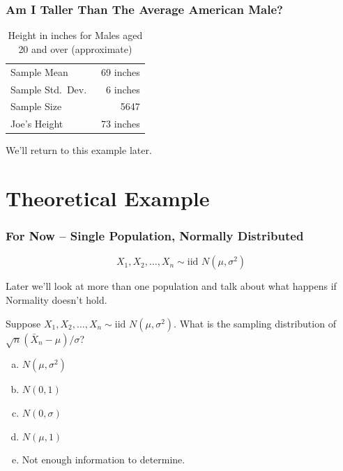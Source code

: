 \documentclass{beamer}
\begin{document}
\begin{frame}
\frametitle{Am I Taller Than The Average American Male?}
	
	\begin{table}[h]
	\caption{Height in inches for Males aged 20 and over (approximate)}
		\begin{tabular}{|lr|}
		\hline
			Sample Mean & 69 inches\\
			Sample Std.\ Dev.\ & 6 inches\\
			Sample Size & 5647 \\
			\hline
			Joe's Height & 73 inches\\
			\hline
		\end{tabular}
	\end{table}

\vspace{2em}
\alert{We'll return to this example later.}

\end{frame}

\section{Theoretical Example}
\begin{frame}
\frametitle{For Now -- Single Population, Normally Distributed}
\Large
$$\boxed{X_1, X_2, \hdots, X_n\sim \mbox{iid } N(\mu,\sigma^2)}$$


\vspace{4em}
\normalsize
\alert{Later we'll look at more than one population and talk about what happens if Normality doesn't hold.}
\end{frame}

\begin{frame}
Suppose $X_1, X_2, \hdots, X_n \sim \mbox{iid } N(\mu,\sigma^2)$. What is the sampling distribution of $\sqrt{n}(\bar{X}_n - \mu)/\sigma$?


\begin{enumerate}[(a)]
\item $N(\mu, \sigma^2)$
\item $N(0,1)$
\item $N(0,\sigma)$
\item $N(\mu, 1)$
\item Not enough information to determine.
\end{enumerate}

\end{frame}
\end{document}
